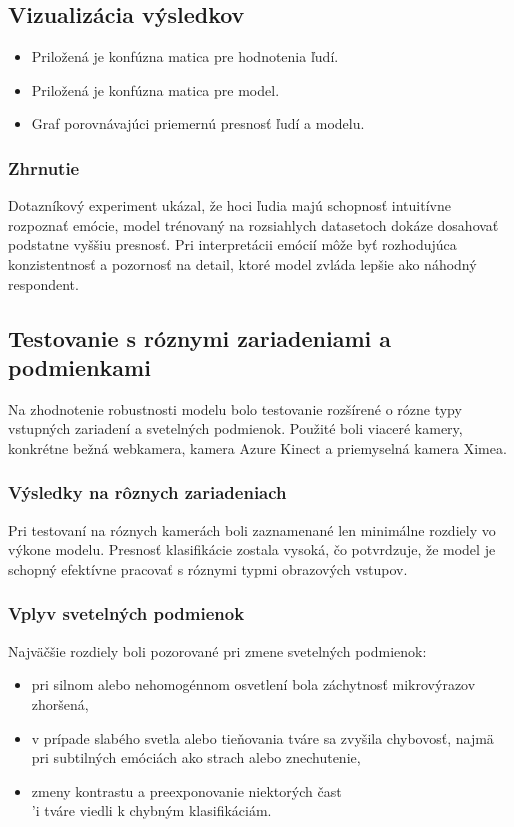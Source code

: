 \subsection{Vizualiz\'acia v\'ysledkov}
\begin{itemize}
    \item Prilo\v{z}en\'a je konf\'uzna matica pre hodnotenia \v{l}ud\'i.
    \item Prilo\v{z}en\'a je konf\'uzna matica pre model.
    \item Graf porovn\'avaj\'uci priemern\'u presnos\v{t} \v{l}ud\'i a modelu.
\end{itemize}

\subsubsection{Zhrnutie}
Dotazn\'ikov\'y experiment uk\'azal, \v{z}e hoci \v{l}udia maj\'u schopnos\v{t} intuit\'ivne rozpozna\v{t} em\'ocie, model tr\'enovan\'y na rozsiahlych datasetoch dok\'aze dosahova\v{t} podstatne vy\v{s}\v{s}iu presnos\v{t}. Pri interpret\'acii em\'oci\'i m\^o\v{z}e by\v{t} rozhoduj\'uca konzistentnos\v{t} a pozornos\v{t} na detail, ktor\'e model zvl\'ada lep\v{s}ie ako n\'ahodn\'y respondent.

\subsection{Testovanie s r\'oznymi zariadeniami a podmienkami}

Na zhodnotenie robustnosti modelu bolo testovanie roz\v{s}\'{i}ren\'e o r\'ozne typy vstupn\'ych zariaden\'i a sveteln\'ych podmienok. Pou\v{z}it\'e boli viacer\'e kamery, konkr\'etne be\v{z}n\'a webkamera, kamera Azure Kinect a priemyseln\'a kamera Ximea.

\subsubsection{Výsledky na rôznych zariadeniach}
Pri testovan\'i na r\'oznych kamer\'ach boli zaznamenan\'e len minim\'alne rozdiely vo v\'ykone modelu. Presnos\v{t} klasifik\'acie zostala vysok\'a, \v{c}o potvrdzuje, \v{z}e model je schopn\'y efekt\'ivne pracova\v{t} s r\'oznymi typmi obrazov\'ych vstupov.

\subsubsection{Vplyv svetelných podmienok}
Najv\"a\v{c}\v{s}ie rozdiely boli pozorovan\'e pri zmene sveteln\'ych podmienok:
\begin{itemize}
    \item pri silnom alebo nehomog\'ennom osvetlen\'i bola z\'achytnos\v{t} mikrov\'yrazov zhor\v{s}en\'a,
    \item v pr\'ipade slab\'eho svetla alebo tie\v{n}ovania tv\'are sa zvy\v{s}ila chybovos\v{t}, najm\"a pri subtiln\'ych em\'oci\'ach ako strach alebo znechutenie,
    \item zmeny kontrastu a preexponovanie niektor\'ych \v{c}ast\\'i tv\'are viedli k chybn\'ym klasifik\'aci\'am.
\end{itemize}

